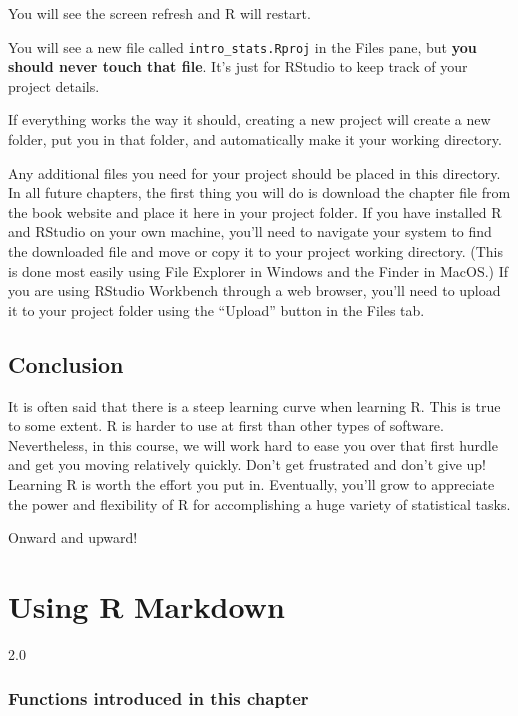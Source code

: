 \documentclass[
]{book}
\begin{document}
You will see the screen refresh and R will restart.

You will see a new file called \texttt{intro\_stats.Rproj} in the Files pane, but \textbf{you should never touch that file}. It's just for RStudio to keep track of your project details.

If everything works the way it should, creating a new project will create a new folder, put you in that folder, and automatically make it your working directory.

Any additional files you need for your project should be placed in this directory. In all future chapters, the first thing you will do is download the chapter file from the book website and place it here in your project folder. If you have installed R and RStudio on your own machine, you'll need to navigate your system to find the downloaded file and move or copy it to your project working directory. (This is done most easily using File Explorer in Windows and the Finder in MacOS.) If you are using RStudio Workbench through a web browser, you'll need to upload it to your project folder using the ``Upload'' button in the Files tab.

\hypertarget{intror-conclusion}{%
\section{Conclusion}\label{intror-conclusion}}

It is often said that there is a steep learning curve when learning R. This is true to some extent. R is harder to use at first than other types of software. Nevertheless, in this course, we will work hard to ease you over that first hurdle and get you moving relatively quickly. Don't get frustrated and don't give up! Learning R is worth the effort you put in. Eventually, you'll grow to appreciate the power and flexibility of R for accomplishing a huge variety of statistical tasks.

Onward and upward!

\hypertarget{rmark}{%
\chapter{Using R Markdown}\label{rmark}}

2.0

\hypertarget{functions-introduced-in-this-chapter-1}{%
\subsection*{Functions introduced in this chapter}\label{functions-introduced-in-this-chapter-1}}
\end{document}
